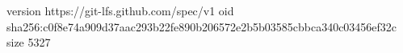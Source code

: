 version https://git-lfs.github.com/spec/v1
oid sha256:c0f8e74a909d37aac293b22fe890b206572e2b5b03585cbbca340c03456ef32c
size 5327
